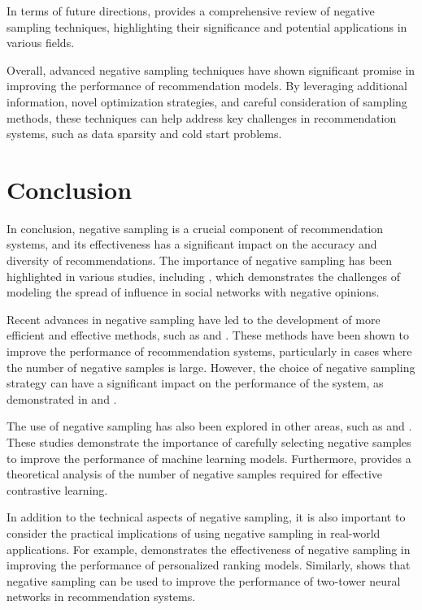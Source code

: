 \documentclass[11pt,a4paper]{article}
\begin{document}
In terms of future directions, \cite{doi:10.1109/tpami.2024.3371473} provides a comprehensive review of negative sampling techniques, highlighting their significance and potential applications in various fields. 

Overall, advanced negative sampling techniques have shown significant promise in improving the performance of recommendation models. By leveraging additional information, novel optimization strategies, and careful consideration of sampling methods, these techniques can help address key challenges in recommendation systems, such as data sparsity and cold start problems.


\section{Conclusion}


In conclusion, negative sampling is a crucial component of recommendation systems, and its effectiveness has a significant impact on the accuracy and diversity of recommendations. The importance of negative sampling has been highlighted in various studies, including \cite{doi:10.1137/1.9781611972818.33}, which demonstrates the challenges of modeling the spread of influence in social networks with negative opinions.

Recent advances in negative sampling have led to the development of more efficient and effective methods, such as \cite{doi:10.1145/2983323.2983874} and \cite{arxiv:1708.06816}. These methods have been shown to improve the performance of recommendation systems, particularly in cases where the number of negative samples is large. However, the choice of negative sampling strategy can have a significant impact on the performance of the system, as demonstrated in \cite{doi:10.1145/3097983.3098202} and \cite{doi:10.1145/3366423.3380303}.

The use of negative sampling has also been explored in other areas, such as \cite{arxiv:2010.12523} and \cite{doi:10.1145/3581783.3612101}. These studies demonstrate the importance of carefully selecting negative samples to improve the performance of machine learning models. Furthermore, \cite{doi:10.24963/ijcai.2022/348} provides a theoretical analysis of the number of negative samples required for effective contrastive learning.

In addition to the technical aspects of negative sampling, it is also important to consider the practical implications of using negative sampling in real-world applications. For example, \cite{doi:10.1145/3366423.3380187} demonstrates the effectiveness of negative sampling in improving the performance of personalized ranking models. Similarly, \cite{doi:10.1145/3366424.3386195} shows that negative sampling can be used to improve the performance of two-tower neural networks in recommendation systems.
\end{document}
